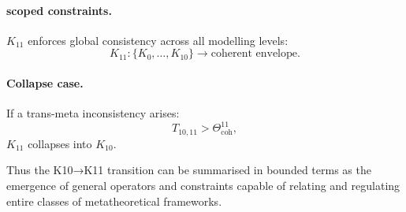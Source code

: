 \paragraph{scoped constraints.}
$K_{11}$ enforces global consistency across all modelling levels:
\[
K_{11} : \{K_0,\dots,K_{10}\} \rightarrow \text{coherent envelope}.
\]

\paragraph{Collapse case.}
If a trans-meta inconsistency arises:
\[
T_{10,11} > \Theta^{11}_{\mathrm{coh}},
\]
$K_{11}$ collapses into $K_{10}$.

Thus the K10→K11 transition can be summarised in bounded terms as the
emergence of general operators and constraints capable of relating and
regulating entire classes of metatheoretical frameworks.
